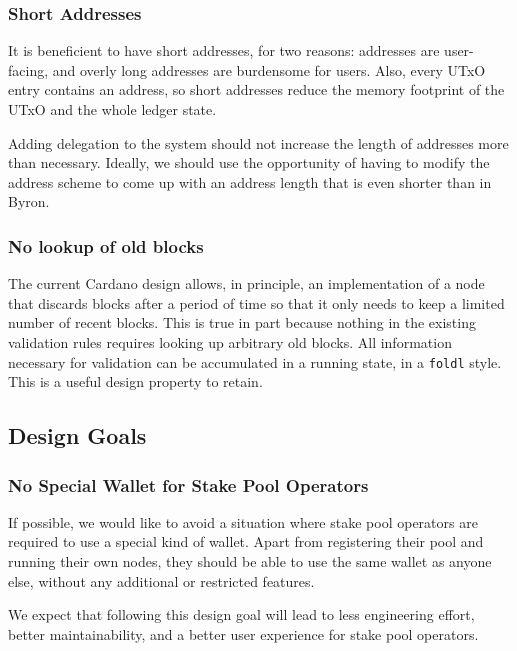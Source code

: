 \documentclass[11pt,a4paper,dvipsnames,twosided]{article}
\begin{document}
\subsubsection{Short Addresses}
\label{short-addresses}

It is beneficient to have short addresses, for two reasons: addresses are
user-facing, and overly long addresses are burdensome for users. Also, every
UTxO entry contains an address, so short addresses reduce the memory footprint
of the UTxO and the whole ledger state.

Adding delegation to the system should not increase the length of
addresses more than necessary. Ideally, we should use the opportunity of having
to modify the address scheme to come up with an address length that is
even shorter than in Byron.

\subsubsection{No lookup of old blocks}
\label{no-lookup-of-old-blocks}

The current Cardano design allows, in principle, an implementation of a
node that discards blocks after a period of time so that it only needs
to keep a limited number of recent blocks. This is true in part because
nothing in the existing validation rules requires looking up arbitrary
old blocks. All information necessary for validation can be accumulated
in a running state, in a \texttt{foldl} style. This is a useful design
property to retain.

\subsection{Design Goals}
\label{design-goals}

\subsubsection{No Special Wallet for Stake Pool Operators}
\label{no-special-wallet-for-stake-pool-operators}

If possible, we would like to avoid a situation where stake pool
operators are required to use a special kind of wallet. Apart from
registering their pool and running their own nodes, they should be able
to use the same wallet as anyone else, without any additional or
restricted features.

We expect that following this design goal will lead to less engineering
effort, better maintainability, and a better user experience for stake
pool operators.
\end{document}
